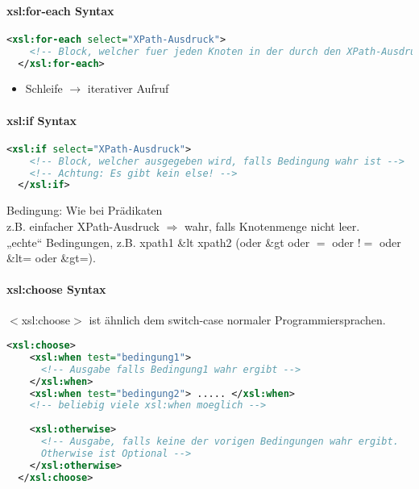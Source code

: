 \paragraph{xsl:for-each Syntax}\hspace{1mm}
\begin{lstlisting}[caption={xsl:for-each Syntax}, label={lst:xsl:for-each}, language={XML}]
  <xsl:for-each select="XPath-Ausdruck">
    <!-- Block, welcher fuer jeden Knoten in der durch den XPath-Ausdruck bestimmten Knotenmenge ausgegeben wird - relative Position im Dokumentbaum entspricht diesem Knoten -->
  </xsl:for-each>
\end{lstlisting}
\begin{itemize}
\item Schleife $\rightarrow$ iterativer Aufruf
\end{itemize}

\paragraph{xsl:if Syntax}\hspace{1mm}
\begin{lstlisting}[caption={xsl:if Syntax}, label={lst:xsl:if}, language={XML}]
  <xsl:if select="XPath-Ausdruck">
    <!-- Block, welcher ausgegeben wird, falls Bedingung wahr ist -->
    <!-- Achtung: Es gibt kein else! -->
  </xsl:if>
\end{lstlisting}
Bedingung: Wie bei Prädikaten\\
z.B. einfacher XPath-Ausdruck $\Rightarrow$ wahr, falls Knotenmenge nicht leer.\\
„echte“ Bedingungen, z.B. xpath1 \&lt xpath2 (oder \&gt oder $=$ oder $!=$ oder \&lt= oder \&gt=).

\paragraph{xsl:choose Syntax}
$<$xsl:choose$>$ ist ähnlich dem switch-case normaler Programmiersprachen.
\begin{lstlisting}[caption={xsl:choose Syntax}, label={lst:xsl:choose}, language={XML}]
  <xsl:choose>
    <xsl:when test="bedingung1">
      <!-- Ausgabe falls Bedingung1 wahr ergibt -->
    </xsl:when>
    <xsl:when test="bedingung2"> ..... </xsl:when>
    <!-- beliebig viele xsl:when moeglich -->
    
    <xsl:otherwise>
      <!-- Ausgabe, falls keine der vorigen Bedingungen wahr ergibt.
      Otherwise ist Optional -->
    </xsl:otherwise>    
  </xsl:choose>
\end{lstlisting}


